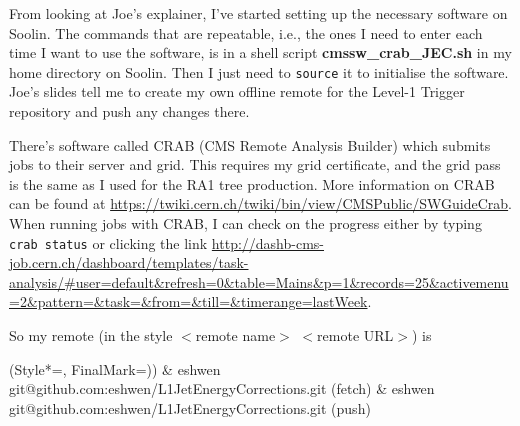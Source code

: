 From looking at Joe's explainer, I've started setting up the necessary software on Soolin. The commands that are repeatable, i.e., the ones I need to enter each time I want to use the software, is in a shell script \textbf{cmssw\_crab\_JEC.sh} in my home directory on Soolin. Then I just need to \texttt{source} it to initialise the software. Joe's slides tell me to create my own offline remote for the Level-1 Trigger repository and push any changes there.



There's software called CRAB (CMS Remote Analysis Builder) which submits jobs to their server and grid. This requires my grid certificate, and the grid pass is the same as I used for the RA1 tree production. More information on CRAB can be found at \sloppy\url{https://twiki.cern.ch/twiki/bin/view/CMSPublic/SWGuideCrab}. When running jobs with CRAB, I can check on the progress either by typing \texttt{crab status} or clicking the link \sloppy\url{http://dashb-cms-job.cern.ch/dashboard/templates/task-analysis/#user=default&refresh=0&table=Mains&p=1&records=25&activemenu=2&pattern=&task=&from=&till=&timerange=lastWeek}.


So my remote (in the style $<$remote name$>$ $<$remote URL$>$) is

\begin{easylist}
\ListProperties(Style*=, FinalMark={)})
& eshwen	\quad\quad git@github.com:eshwen/L1JetEnergyCorrections.git (fetch)
& eshwen	\quad\quad git@github.com:eshwen/L1JetEnergyCorrections.git (push)
\end{easylist}


